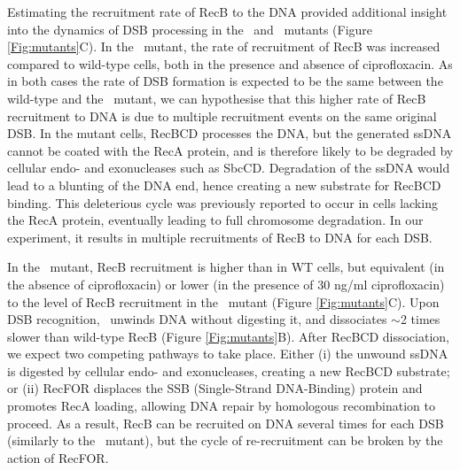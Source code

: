 Estimating the recruitment rate of RecB to the DNA provided additional insight into the dynamics of DSB processing in the \dreca\ and \teneighty\ mutants (Figure \ref{Fig:mutants}C). In the \dreca\ mutant, the rate of recruitment of RecB was increased compared to wild-type cells, both in the presence and absence of ciprofloxacin. As in both cases the rate of DSB formation is expected to be the same between the wild-type and the \dreca\ mutant, we can hypothesise that this higher rate of RecB recruitment to DNA is due to multiple recruitment events on the same original DSB. In the mutant cells, RecBCD processes the DNA, but the generated ssDNA cannot be coated with the RecA protein, and is therefore likely to be degraded by cellular endo- and exonucleases such as SbcCD. Degradation of the ssDNA would lead to a blunting of the DNA end, hence creating a new substrate for RecBCD binding. This deleterious cycle was previously reported to occur in cells lacking the RecA protein, eventually leading to full chromosome degradation\cite{Capaldo1975,Skarstad1993}. In our experiment, it results in multiple recruitments of RecB to DNA for each DSB.

In the \teneighty\ mutant, RecB recruitment is higher than in WT cells, but equivalent (in the absence of ciprofloxacin) or lower (in the presence of 30 ng/ml ciprofloxacin) to the level of RecB recruitment in the \dreca\ mutant (Figure \ref{Fig:mutants}C). Upon DSB recognition, \teneighty\ unwinds DNA without digesting it, and dissociates $\sim$2 times slower than wild-type RecB (Figure \ref{Fig:mutants}B). After RecBCD dissociation, we expect two competing pathways to take place. Either (i) the unwound ssDNA is digested by cellular endo- and exonucleases, creating a new RecBCD substrate; or (ii) RecFOR displaces the SSB (Single-Strand DNA-Binding) protein and promotes RecA loading, allowing DNA repair by homologous recombination to proceed.\cite{Ivancic-Bace_2003} As a result, RecB can be recruited on DNA several times for each DSB (similarly to the \dreca\ mutant), but the cycle of re-recruitment can be broken by the action of RecFOR.

